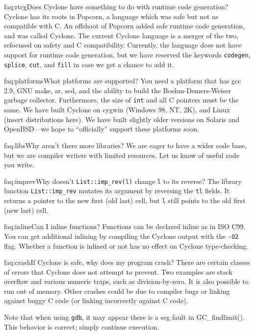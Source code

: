 \begin{faqa}{faq:rtcg}{Does Cyclone have something to do with runtime code generation?}
Cyclone has its roots in Popcorn, a language which was safe but not as
compatible with C\@.  An offshoot of Popcorn added safe runtime code
generation, and was called Cyclone.  The current Cyclone language is a
merger of the two, refocused on safety and C compatibility.
Currently, the language does not have support for runtime code
generation, but we have reserved the keywords \texttt{codegen},
\texttt{splice}, \texttt{cut}, and \texttt{fill} in case we get a
chance to add it.
\end{faqa}

\begin{faqa}{faq:platforms}{What platforms are supported?}
You need a platform that has gcc 2.9, GNU make, ar, sed, and the
ability to build the Boehm-Demers-Weiser garbage collector.
Furthermore, the size of \texttt{int} and all C pointers must be the
same.  We have built Cyclone on cygwin (Windows 98, NT, 2K), and Linux
(insert distributions here).  We have built slightly older versions on
Solaris and OpenBSD---we hope to ``officially'' support these
platforms soon.
\end{faqa}

\begin{faqa}{faq:libs}{Why aren't there more libraries?}
We are eager to have a wider code base, but we are compiler writers
with limited resources.  Let us know of useful code you write.
\end{faqa}

\begin{faqa}{faq:imprev}{Why doesn't \texttt{List::imp_rev(l)} change \texttt{l} to its reverse?} 
The library function \texttt{List::imp_rev} mutates its argument by
reversing the \texttt{tl} fields.  It returns a pointer to the new
first (old last) cell, but \texttt{l} still points to the old first
(new last) cell.
\end{faqa}

\begin{faqa}{faq:inline}{Can I inline functions?}
Functions can be declared inline as in ISO C99.  You can get additional
inlining by compiling the Cyclone output with the \texttt{-O2} flag.
Whether a function is inlined or not has no effect on Cyclone
type-checking.
\end{faqa}

\begin{faqa}{faq:crash}{If Cyclone is safe, why does my program crash?}
There are certain classes of errors that Cyclone does not attempt to
prevent.  Two examples are stack overflow and various numeric traps,
such as division-by-zero.  It is also possible to run out of memory.
Other crashes could be due to compiler bugs or linking against buggy C
code (or linking incorrectly against C code).

Note that when using \texttt{gdb}, it may appear there is a seg fault
in GC_findlimit().  This behavior is correct; simply continue
execution.
\end{faqa}

